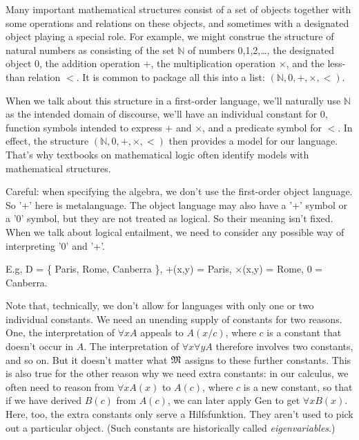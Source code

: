 \iffalse


Many important mathematical structures consist of a set of objects together with some operations and relations on these objects,
and sometimes with a designated object playing a special role.
For example, we might construe the structure of natural numbers as consisting of the set $\mathbb{N}$ of numbers 0,1,2,\ldots, the designated object 0, the addition operation $+$, the multiplication operation $\times$, and the less-than relation $<$.
It is common to package all this into a list: $(\mathbb{N}, 0, +, \times, <)$.

When we talk about this structure in a first-order language,
we'll naturally use $\mathbb{N}$ as the intended domain of discourse,
we'll have an individual constant for 0,
function symbols intended to express $+$ and $\times$,
and a predicate symbol for $<$.
In effect, the structure $(\mathbb{N}, 0, +, \times, <)$ then provides a model for our language.
That's why textbooks on mathematical logic often identify models with mathematical structures.

Careful: when specifying the algebra, we don't use the first-order object
language. So '+' here is metalanguage. The object language may also have a '+'
symbol or a '0' symbol, but they are not treated as logical. So their meaning
isn't fixed. When we talk about logical entailment, we need to consider any
possible way of interpreting '0' and '+'.

E.g, D = \{ Paris, Rome, Canberra \}, +(x,y) = Paris, $\times$(x,y) = Rome, 0 = Canberra.

Note that, technically, we don't allow for languages with only one or two individual constants.
We need an unending supply of constants for two reasons.
One, the interpretation of $\forall x A$ appeals to $A(x/c)$,
where $c$ is a constant that doesn't occur in $A$.
The interpretation of $\forall x \forall y A$ therefore involves two constants, and so on.
But it doesn't matter what $\mathfrak{M}$ assigns to these further constants.
This is also true for the other reason why we need extra constants:
in our calculus,
we often need to reason from $\forall x A(x)$ to $A(c)$,
where $c$ is a new constant,
so that if we have derived $B(c)$ from $A(c)$,
we can later apply Gen to get $\forall x B(x)$.
Here, too, the extra constants only serve a Hilfsfunktion.
They aren't used to pick out a particular object.
(Such constants are historically called \emph{eigenvariables}.)



